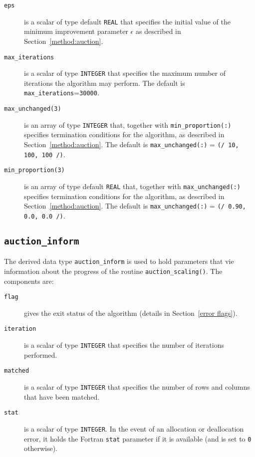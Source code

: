 \begin{description}

\item[\texttt{eps}] is a scalar of type default \texttt{REAL} that specifies the initial value of the minimum improvement parameter $\epsilon$ as described in Section~\ref{method:auction}.

\item[\texttt{max\_iterations}] is a scalar of type \texttt{INTEGER} that specifies the maximum number of iterations the algorithm may perform. The default is \texttt{max\_iterations}=\texttt{30000}.

\item[\texttt{max\_unchanged(3)}] is an array of type \texttt{INTEGER} that, together with \texttt{min\_proportion(:)} specifies termination conditions for the algorithm, as described in Section~\ref{method:auction}. The default is \texttt{max\_unchanged(:)} = \texttt{(/ 10, 100, 100 /)}.

\item[\texttt{min\_proportion(3)}] is an array of type default \texttt{REAL} that, together with \texttt{max\_unchanged(:)} specifies termination conditions for the algorithm, as described in Section~\ref{method:auction}. The default is \texttt{max\_unchanged(:)} = \texttt{(/ 0.90, 0.0, 0.0 /)}.

\end{description}

\subsection{\texttt{auction\_inform}} \label{type:auction_inform}

The derived data type \texttt{auction\_inform} is used to hold parameters that vie information about the progress of the routine \texttt{auction\_scaling()}. The components are:

\begin{description}

\item[\texttt{flag}] gives the exit status of the algorithm (details in Section~\ref{error flags}).

\item[\texttt{iteration}] is a scalar of type \texttt{INTEGER} that specifies the number of iterations performed.

\item[\texttt{matched}] is a scalar of type \texttt{INTEGER} that specifies the number of rows and columns that have been matched.

\item[\texttt{stat}] is a scalar of type \texttt{INTEGER}. In the event of an allocation or deallocation error, it holds the Fortran \texttt{stat} parameter if it is available (and is set to \texttt{0} otherwise).
\end{description}

